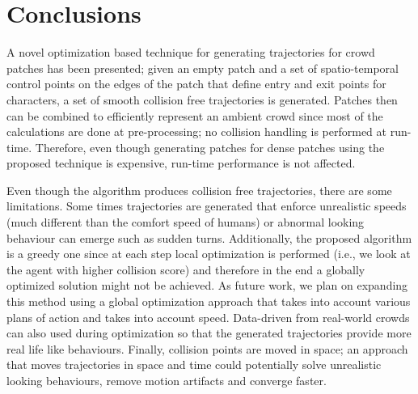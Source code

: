\section{Conclusions}
\label{sec:conclusions}

A novel optimization based technique for generating trajectories for crowd patches has been presented;
given an empty patch and a set of spatio-temporal control points on the edges of the patch that define entry and exit points for characters, a set of smooth collision free trajectories is generated.
Patches then can be combined to efficiently represent an ambient crowd since most of the calculations are done at pre-processing; no collision handling is performed at run-time.
Therefore, even though generating patches for dense patches using the proposed technique is expensive, run-time performance is not affected.

Even though the algorithm produces collision free trajectories, there are some limitations.
Some times trajectories are generated that enforce unrealistic speeds (much different than the comfort speed of humans) or abnormal looking behaviour can emerge such  as sudden turns.
Additionally, the proposed algorithm is a greedy one since at each step local optimization is performed (i.e., we look at the agent with higher collision score) and therefore in the end a globally optimized solution might not be achieved.
As future work, we plan on expanding this method using a global optimization approach that takes into account various plans of action and takes into account speed.
Data-driven from real-world crowds can also used during optimization so that the generated trajectories provide more real life like behaviours.
Finally, collision points are moved in space; an approach that moves trajectories in space and time could potentially solve unrealistic looking behaviours, remove motion artifacts and converge faster.

